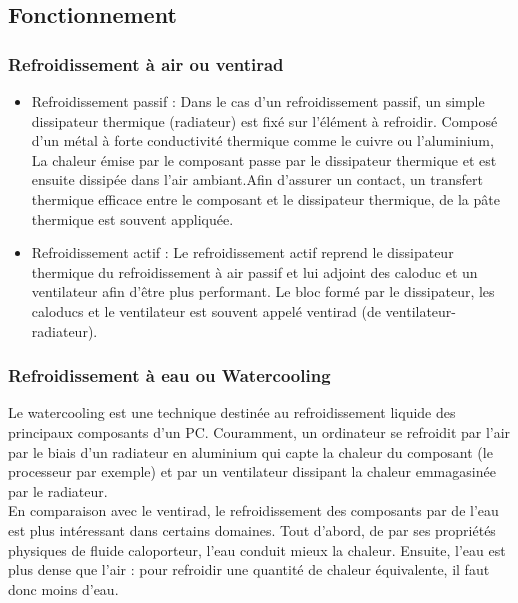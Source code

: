 \documentclass[a4paper,12pt]{article}
\begin{document}
        \subsection{Fonctionnement}
        
            \subsubsection{Refroidissement à air ou ventirad}
                \begin{itemize}
                    \item Refroidissement passif : Dans le cas d'un refroidissement passif, un simple dissipateur thermique (radiateur) est fixé sur l'élément à refroidir. Composé d'un métal à forte conductivité thermique comme le cuivre ou l'aluminium, La chaleur émise par le composant passe par le dissipateur thermique et est ensuite dissipée dans l'air ambiant.Afin d'assurer un contact, un transfert thermique efficace entre le composant et le dissipateur thermique, de la pâte thermique est souvent appliquée. \\
        
                    \item Refroidissement actif : Le refroidissement actif reprend le dissipateur thermique du refroidissement à air passif et lui adjoint des caloduc et un ventilateur afin d'être plus performant. Le bloc formé par le dissipateur, les caloducs et le ventilateur est souvent appelé ventirad (de ventilateur-radiateur).
                \end{itemize}
                
            \subsubsection{Refroidissement à eau ou Watercooling}
                Le watercooling est une technique destinée au refroidissement liquide des principaux composants d'un PC. Couramment, un ordinateur se refroidit par l'air par le biais d'un radiateur en aluminium qui capte la chaleur du composant (le processeur par exemple) et par un ventilateur dissipant la chaleur emmagasinée par le radiateur. \\
                En comparaison avec le ventirad, le refroidissement des composants par de l'eau est plus intéressant dans certains domaines. Tout d'abord, de par ses propriétés physiques de fluide caloporteur, l'eau conduit mieux la chaleur. Ensuite, l'eau est plus dense que l'air : pour refroidir une quantité de chaleur équivalente, il faut donc moins d'eau.
    
\end{document}
